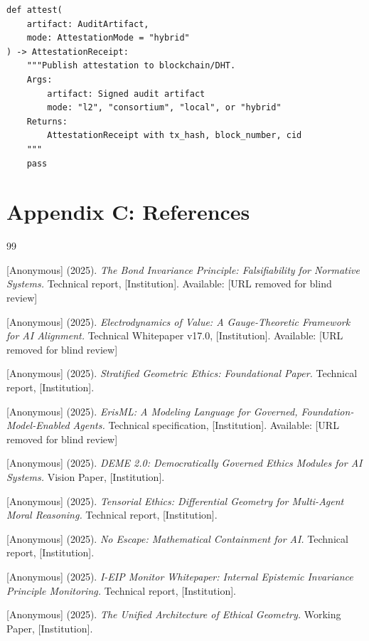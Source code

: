 \documentclass[11pt,letterpaper]{article}
\theoremstyle{definition}
\theoremstyle{remark}
\begin{document}
\begin{lstlisting}
def attest(
    artifact: AuditArtifact,
    mode: AttestationMode = "hybrid"
) -> AttestationReceipt:
    """Publish attestation to blockchain/DHT.
    Args:
        artifact: Signed audit artifact
        mode: "l2", "consortium", "local", or "hybrid"
    Returns:
        AttestationReceipt with tx_hash, block_number, cid
    """
    pass
\end{lstlisting}


\section*{Appendix C: References}

\begin{thebibliography}{99}

[Anonymous] (2025). \emph{The Bond Invariance Principle: Falsifiability for Normative Systems.} Technical report, [Institution]. Available: [URL removed for blind review]

[Anonymous] (2025). \emph{Electrodynamics of Value: A Gauge-Theoretic Framework for AI Alignment.} Technical Whitepaper v17.0, [Institution]. Available: [URL removed for blind review]

[Anonymous] (2025). \emph{Stratified Geometric Ethics: Foundational Paper.} Technical report, [Institution].

[Anonymous] (2025). \emph{ErisML: A Modeling Language for Governed, Foundation-Model-Enabled Agents.} Technical specification, [Institution]. Available: [URL removed for blind review]

[Anonymous] (2025). \emph{DEME 2.0: Democratically Governed Ethics Modules for AI Systems.} Vision Paper, [Institution].

[Anonymous] (2025). \emph{Tensorial Ethics: Differential Geometry for Multi-Agent Moral Reasoning.} Technical report, [Institution].

[Anonymous] (2025). \emph{No Escape: Mathematical Containment for AI.} Technical report, [Institution].

[Anonymous] (2025). \emph{I-EIP Monitor Whitepaper: Internal Epistemic Invariance Principle Monitoring.} Technical report, [Institution].

[Anonymous] (2025). \emph{The Unified Architecture of Ethical Geometry.} Working Paper, [Institution].


\end{thebibliography}
\end{document}
